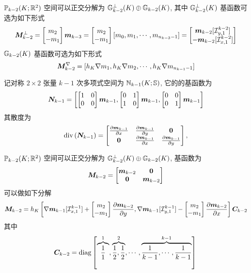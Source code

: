\documentclass{article}
\begin{document}
${\mathbb P}_{k-2}(K;{\mathbb R}^2)$ 空间可以正交分解为 ${\mathbb G}^\perp_{k-2}(K) \oplus
{\mathbb G}_{k-2}(K)$, 其中 ${\mathbb G}^\perp_{k-2}(K)$ 基函数可选为如下形式
$$
{\boldsymbol M}_{k-2}^\perp = 
\begin{bmatrix}
    m_2 \\ -m_1
\end{bmatrix} {\boldsymbol m}_{k-3} = 
\begin{bmatrix}
    m_2 \\ -m_1
\end{bmatrix} 
[m_0, m_1, \cdots, m_{n_{k-3}-1}]
= 
\begin{bmatrix}
    {\boldsymbol m}_{k-2}[{\mathcal I}_{y, 1}^{k-2}] \\ -{\boldsymbol m}_{k-2}[{\mathcal I}_{x, 1}^{k-2}]
\end{bmatrix}
$$
${\mathbb G}_{k-2}(K)$ 基函数可选为如下形式
$$
{\boldsymbol M}_{k-2}^\nabla = [h_K\nabla m_1, h_K\nabla m_2, \cdots, h_K\nabla m_{n_{k-1}-1}]
$$

记对称 $2\times 2$ 张量 $k-1$ 次多项式空间为 ${\mathbb N}_{k-1}(K;{\mathbb S})$, 它的的基函数为
$$
{\boldsymbol N}_{k-1} = 
\left[
\begin{bmatrix}
    1 & 0 \\ 0 & 0 
\end{bmatrix} 
{\boldsymbol m}_{k-1}, 
\begin{bmatrix}
    0 & 1 \\ 1 & 0 
\end{bmatrix} 
{\boldsymbol m}_{k-1},
\begin{bmatrix}
    0 & 0 \\ 0 & 1 
\end{bmatrix} 
{\boldsymbol m}_{k-1}\right] 
$$
其散度为
$$
\operatorname{div}\left({\boldsymbol N}_{k-1}\right) = 
\begin{bmatrix}
 \frac{\partial{\boldsymbol m}_{k-1}}{\partial x} & \frac{\partial{\boldsymbol m}_{k-1}}{\partial y} &
 \mathbf 0 \\
 \mathbf 0 & \frac{\partial{\boldsymbol m}_{k-1}}{\partial x} & 
 \frac{\partial{\boldsymbol m}_{k-1}}{\partial y} 
\end{bmatrix}, 
$$

${\mathbb P}_{k-2}(K;{\mathbb R}^2)$ 空间可以正交分解为 ${\mathbb G}^\perp_{k-2}(K) \oplus
{\mathbb G}_{k-2}(K)$, 基函数为
$$
{\boldsymbol M}_{k-2} = 
\begin{bmatrix}
    {\boldsymbol m}_{k-2} & \mathbf 0\\
    \mathbf 0 & {\boldsymbol m}_{k-2}
\end{bmatrix}
$$
可以做如下分解
\begin{equation} \label{eq:split}
{\boldsymbol M}_{k-2} = h_K\left[ 
\nabla {\boldsymbol m}_{k-1}[{\mathcal I}^{k-1}_{x, 1}]+
\begin{bmatrix}
   m_2 \\ -m_1 
\end{bmatrix}
\frac{\partial {\boldsymbol m}_{k-2}}{\partial y}
,
\nabla {\boldsymbol m}_{k-1}[{\mathcal I}^{k-1}_{y, 1}] - 
\begin{bmatrix}
   m_2 \\ -m_1 
\end{bmatrix}
\frac{\partial {\boldsymbol m}_{k-2}}{\partial x}
\right]{\boldsymbol C}_{k-2}
\end{equation}
其中
$$
{\boldsymbol C}_{k-2} = 
\operatorname{diag}\left[\overbrace{\frac{1}{1}}^1, \overbrace{\frac{1}{2}, \frac{1}{2}}^2,
\cdots, \overbrace{\frac{1}{k-1}, \cdots, \frac{1}{k-1}}^{k-1}\right] \\
$$
\end{document}
